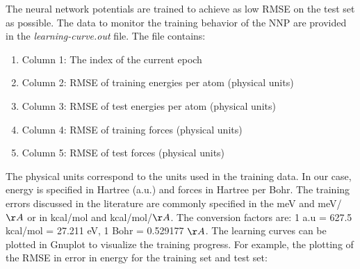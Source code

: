\documentclass[12pt]{article}
\begin{document}
The neural network potentials are trained to achieve as low RMSE on the test set as possible. The data to monitor the training behavior of the NNP are provided in the \textit{learning-curve.out} file. The file contains:
\begin{enumerate}
    \item Column 1: The index of the current epoch
    \item Column 2: RMSE of training energies per atom (physical units)
    \item Column 3: RMSE of test energies per atom (physical units)
    \item Column 4: RMSE of training forces (physical units)
    \item Column 5: RMSE of test forces (physical units)
\end{enumerate}

 The physical units correspond to the units used in the training data. In our case, energy is specified in Hartree (a.u.) and forces in Hartree per Bohr. The training errors discussed in the literature are commonly specified in the meV and meV/$\AA$ or in kcal/mol and kcal/mol/$\AA$. The conversion factors are: 1 a.u = 627.5 kcal/mol = 27.211 eV, 1 Bohr = 0.529177 $\AA$. The learning curves can be plotted in Gnuplot to visualize the training progress. For example, the plotting of the RMSE in error in energy for the training set and test set:

\begin{center}
\end{center}
\end{document}
